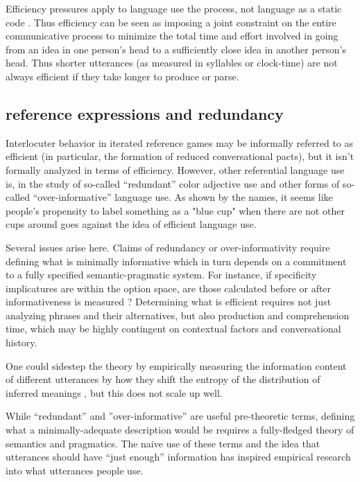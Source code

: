 \documentclass[]{article}
\begin{document}
Efficiency pressures apply to language use the process, not language as a static code \cite{gibson2019}. Thus efficiency can be seen as imposing a joint constraint on the entire communicative process to minimize the total time and effort involved in going from an idea in one person's head to a sufficiently close idea in another person's head. Thus shorter utterances (as measured in syllables or clock-time) are not always efficient if they take longer to produce or parse. 

\subsection{reference expressions and redundancy}
Interlocuter behavior in iterated reference games may be informally referred to as efficient (in particular, the formation of reduced conversational pacts), but it isn't formally analyzed in terms of efficiency. However, other referential language use is, in the study of so-called  ``redundant'' color adjective use and other forms of so-called ``over-informative'' language use. As shown by the names, it seems like people's propensity to label something as a "blue cup" when there are not other cups around goes against the idea of efficient language use. 

Several issues arise here. Claims of redundancy or over-informativity require defining what is minimally informative which in turn depends on a commitment to a fully specified semantic-pragmatic system. For instance, if specificity implicatures are within the option space, are those calculated before or after informativeness is measured \cite{bergen}? Determining what is efficient requires not just analyzing phrases and their alternatives, but also production and comprehension time, which may be highly contingent on contextual factors and conversational history. 

One could sidestep the theory by empirically measuring the information content of different utterances by how they shift the entropy of the distribution of inferred meanings \cite{degen20200406}, but this does not scale up well. 


While ``redundant'' and ''over-informative'' are useful pre-theoretic terms, defining what a minimally-adequate description would be requires a fully-fledged theory of semantics and pragmatics. The naive use of these terms and the idea that utterances should have ``just enough'' information has inspired empirical research into what utterances people use. 
\end{document}

